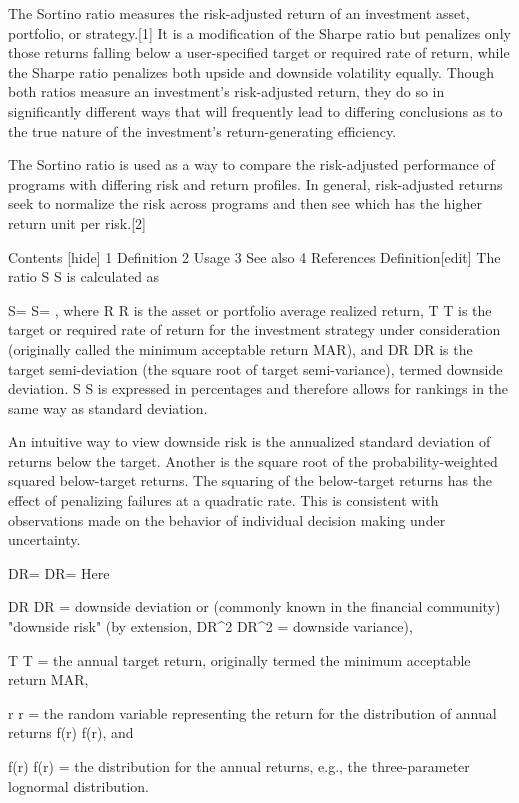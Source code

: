 The Sortino ratio measures the risk-adjusted return of an investment asset, portfolio, or strategy.[1] It is a modification of the Sharpe ratio but penalizes only those returns falling below a user-specified target or required rate of return, while the Sharpe ratio penalizes both upside and downside volatility equally. Though both ratios measure an investment's risk-adjusted return, they do so in significantly different ways that will frequently lead to differing conclusions as to the true nature of the investment's return-generating efficiency.

The Sortino ratio is used as a way to compare the risk-adjusted performance of programs with differing risk and return profiles. In general, risk-adjusted returns seek to normalize the risk across programs and then see which has the higher return unit per risk.[2]

Contents  [hide] 
1	Definition
2	Usage
3	See also
4	References
Definition[edit]
The ratio {\displaystyle S} S is calculated as

{\displaystyle S={}} S={} ,
where {\displaystyle R} R is the asset or portfolio average realized return, {\displaystyle T} T is the target or required rate of return for the investment strategy under consideration (originally called the minimum acceptable return MAR), and {\displaystyle DR} DR is the target semi-deviation (the square root of target semi-variance), termed downside deviation. {\displaystyle S} S is expressed in percentages and therefore allows for rankings in the same way as standard deviation.

An intuitive way to view downside risk is the annualized standard deviation of returns below the target. Another is the square root of the probability-weighted squared below-target returns. The squaring of the below-target returns has the effect of penalizing failures at a quadratic rate. This is consistent with observations made on the behavior of individual decision making under uncertainty.

{\displaystyle DR={}} DR={}
Here

{\displaystyle DR} DR = downside deviation or (commonly known in the financial community) "downside risk" (by extension, {\displaystyle DR^{2}} DR^{2} = downside variance),

{\displaystyle T} T = the annual target return, originally termed the minimum acceptable return MAR,

{\displaystyle r} r = the random variable representing the return for the distribution of annual returns {\displaystyle f(r)} f(r), and

{\displaystyle f(r)} f(r) = the distribution for the annual returns, e.g., the three-parameter lognormal distribution.
